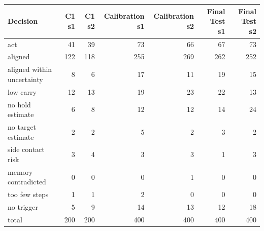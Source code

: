 \begin{tabular}{lrrrrrr}
\toprule
Decision & C1 s1 & C1 s2 & Calibration s1 & Calibration s2 & Final Test s1 & Final Test s2\\
\midrule
act & 41 & 39 & 73 & 66 & 67 & 73\\
aligned & 122 & 118 & 255 & 269 & 262 & 252\\
aligned within uncertainty & 8 & 6 & 17 & 11 & 19 & 15\\
low carry & 12 & 13 & 19 & 23 & 22 & 13\\
no hold estimate & 6 & 8 & 12 & 12 & 14 & 24\\
no target estimate & 2 & 2 & 5 & 2 & 3 & 2\\
side contact risk & 3 & 4 & 3 & 3 & 1 & 3\\
memory contradicted & 0 & 0 & 0 & 1 & 0 & 0\\
too few steps & 1 & 1 & 2 & 0 & 0 & 0\\
no trigger & 5 & 9 & 14 & 13 & 12 & 18\\
\midrule
total & 200 & 200 & 400 & 400 & 400 & 400\\
\bottomrule
\end{tabular}

